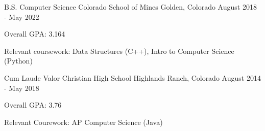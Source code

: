

\begin{cventries}

  \cventry
    {B.S. Computer Science}
    {Colorado School of Mines} %
    {Golden, Colorado} %
    {August 2018 - May 2022} %
    {
      \begin{cvitems} %
        \item {Overall GPA: 3.164}
        \item {Relevant coursework: Data Structures (C++), Intro to Computer Science
    (Python)}
      \end{cvitems}
    }
    
  \cventry
    {Cum Laude}
    {Valor Christian High School} %
    {Highlands Ranch, Colorado} %
    {August 2014 - May 2018} %
    {
      \begin{cvitems} %
        \item {Overall GPA: 3.76}
        \item {Relevant Courework: AP Computer Science (Java) }
      \end{cvitems}
    }

\end{cventries}
